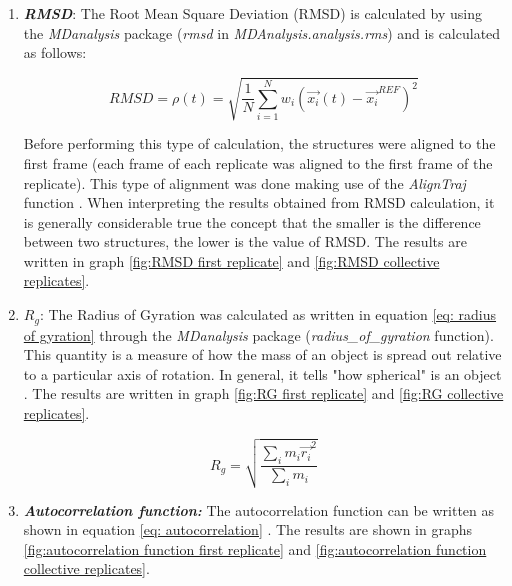 \begin{enumerate}
    \item \textbf{\textit{RMSD}}: The Root Mean Square Deviation (RMSD) is calculated by using the \textit{MDanalysis} package
    \cite{gowersMDAnalysisPythonPackage2016} (\textit{rmsd} in \textit{MDAnalysis.analysis.rms})
    and is calculated as follows:

    \begin{equation} \label{eq: RMSD}
        RMSD = \rho(t) = \sqrt{\frac{1}{N} \sum_{i=1}^N{w_i \left(\vec{x_i}(t) - \vec{x_i}^{REF}\right)^2}}
    \end{equation}

    Before performing this type of calculation, the structures were aligned to the first frame (each frame of each replicate was aligned to the first frame of the replicate). This type of alignment was done making use of the \textit{AlignTraj} function
    \cite{gowersMDAnalysisPythonPackage2016}
    . When interpreting the results obtained from RMSD calculation, it is generally considerable true the concept that the smaller is the difference between two structures, the lower is the value of RMSD. The results are written in graph \ref{fig:RMSD first replicate} and \ref{fig:RMSD collective replicates}.
    


    \item \textbf{$R_g$}: The Radius of Gyration was calculated as written in equation \ref{eq: radius of gyration} through the \textit{MDanalysis} package (\textit{radius\_of\_gyration} function). This quantity is a measure of how the mass of an object is spread out relative to a particular axis of rotation. In general, it tells "how spherical" is an object
    \cite{gowersMDAnalysisPythonPackage2016,tuckermanStatisticalMechanicsTheory2015}
    . The results are written in graph \ref{fig:RG first replicate} and \ref{fig:RG collective replicates}.
    

    \begin{equation} \label{eq: radius of gyration}
        R_g = \sqrt{\frac{\sum_i{m_i \vec{r_i}^2}}{\sum_i{m_i}}}    
    \end{equation}


    \item \textit{\textbf{Autocorrelation function:}} The autocorrelation function can be written as shown in equation \ref{eq: autocorrelation}
    \cite{sumaElectricFieldDrivenTrappingPolyelectrolytes2018}. The results are shown in graphs \ref{fig:autocorrelation function first replicate} and \ref{fig:autocorrelation function collective replicates}. 
    

\end{enumerate}

